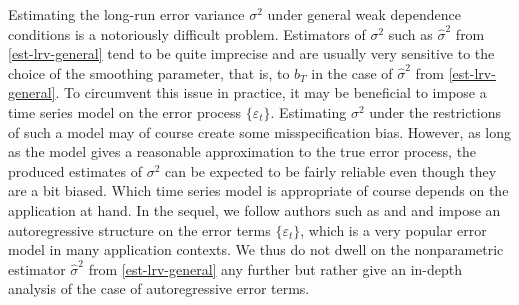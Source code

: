 Estimating the long-run error variance $\sigma^2$ under general weak dependence conditions is a notoriously difficult problem. Estimators of $\sigma^2$ such as $\widehat{\sigma}^2$ from \eqref{est-lrv-general} tend to be quite imprecise and are usually very sensitive to the choice of the smoothing parameter, that is, to $b_T$ in the case of $\widehat{\sigma}^2$ from \eqref{est-lrv-general}. To circumvent this issue in practice, it may be beneficial to impose a time series model on the error process $\{\varepsilon_t\}$. Estimating $\sigma^2$ under the restrictions of such a model may of course create some misspecification bias. However, as long as the model gives a reasonable approximation to the true error process, the produced estimates of $\sigma^2$ can be expected to be fairly reliable even though they are a bit biased. Which time series model is appropriate of course depends on the application at hand. In the sequel, we follow authors such as \cite{Hart1994} and \cite{Hall2003} and impose an autoregressive structure on the error terms $\{\varepsilon_t\}$, which is a very popular error model in many application contexts. We thus do not dwell on the nonparametric estimator $\widehat{\sigma}^2$ from \eqref{est-lrv-general} any further but rather give an in-depth analysis of the case of autoregressive error terms. 



